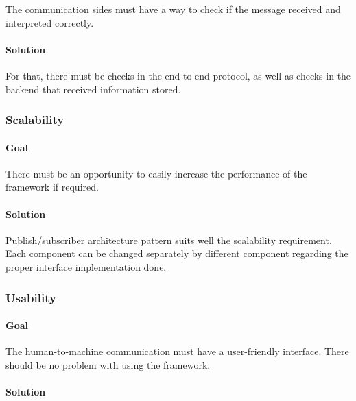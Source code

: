 The communication sides must have a way to check if the message received
and interpreted correctly.

\hypertarget{solution-1}{%
\paragraph{Solution}\label{solution-1}}

For that, there must be checks in the end-to-end protocol, as well as
checks in the backend that received information stored.

\hypertarget{scalability}{%
\subsubsection{Scalability}\label{scalability}}

\hypertarget{goal-2}{%
\paragraph{Goal}\label{goal-2}}

There must be an opportunity to easily increase the performance of the
framework if required.

\hypertarget{solution-2}{%
\paragraph{Solution}\label{solution-2}}

Publish/subscriber architecture pattern suits well the scalability
requirement. Each component can be changed separately by different
component regarding the proper interface implementation done.

\hypertarget{usability}{%
\subsubsection{Usability}\label{usability}}

\hypertarget{goal-3}{%
\paragraph{Goal}\label{goal-3}}

The human-to-machine communication must have a user-friendly interface.
There should be no problem with using the framework.

\hypertarget{solution-3}{%
\paragraph{Solution}\label{solution-3}}

